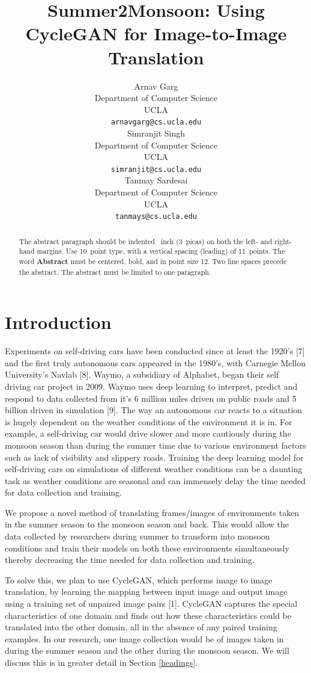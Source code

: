 \documentclass{article}
\title{Summer2Monsoon: Using CycleGAN for Image-to-Image Translation}
\author{
  Arnav Garg \\
  Department of Computer Science\\
  UCLA\\
  \texttt{arnavgarg@cs.ucla.edu} \\
  \And
  Simranjit Singh \\
  Department of Computer Science\\
  UCLA\\
  \texttt{simranjit@cs.ucla.edu} \\
   \And
  Tanmay Sardesai \\
  Department of Computer Science\\
  UCLA\\
  \texttt{tanmays@cs.ucla.edu} \\
}
\begin{document}

\maketitle

\begin{abstract}
  The abstract paragraph should be indented ~inch
  (3~picas) on both the left- and right-hand margins. Use 10~point
  type, with a vertical spacing (leading) of 11~points.  The word
  \textbf{Abstract} must be centered, bold, and in point size 12. Two
  line spaces precede the abstract. The abstract must be limited to
  one paragraph.
\end{abstract}

\section{Introduction}

Experiments on self-driving cars have been conducted since at least the 1920’s [7]
and the first truly autonomous cars appeared in the 1980’s, with Carnegie 
Mellon University’s Navlab [8]. Waymo, a subsidiary of Alphabet, 
began their self driving car project in 2009. Waymo uses deep learning 
to interpret, predict and respond to data collected from it’s 6 million 
miles driven on public roads and 5 billion driven in simulation [9]. 
The way an autonomous car reacts to a situation is hugely dependent on 
the weather conditions of the environment it is in. For example, a 
self-driving car would drive slower and more cautiously during the 
monsoon season than during the summer time due to various environment
 factors such as lack of visibility and slippery roads. 
 Training the deep learning model for self-driving cars on 
 simulations of different weather conditions can be a daunting 
 task as weather conditions are seasonal and can immensely delay 
 the time needed for data collection and training.

We propose a novel method of translating frames/images of environments 
taken in the summer season to the monsoon season and back. 
This would allow the data collected by researchers during 
summer to transform into monsoon conditions and train their 
models on both these environments simultaneously thereby 
decreasing the time needed for data collection and training.

To solve this, we plan to use CycleGAN, which performs image to image 
translation, by learning the mapping between input image and output image 
using a training set of unpaired image pairs [1]. CycleGAN captures the 
special characteristics of one domain and finds out how these 
characteristics could be translated into the other domain, all in the 
absence of any paired training examples. In our research, one image 
collection would be of images taken in during the summer season and 
the other during the monsoon season. We will discuss this is in greater 
detail in Section \ref{headings}.  
\end{document}
